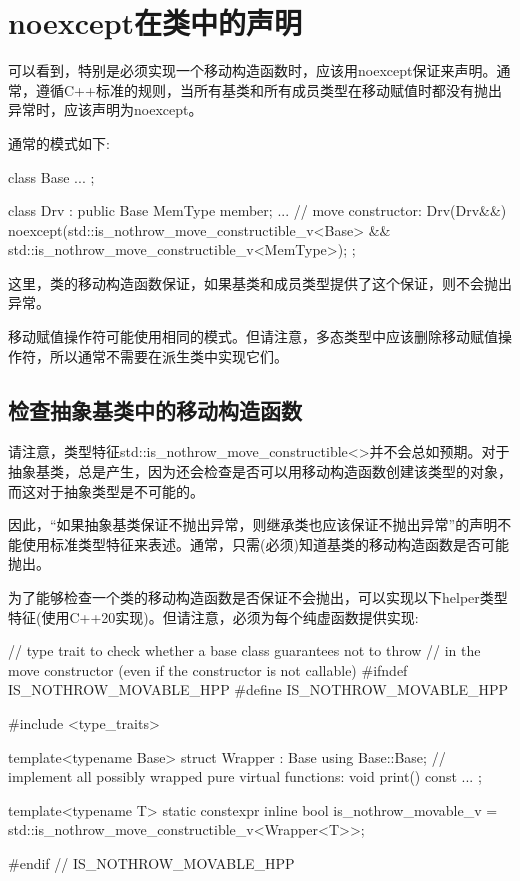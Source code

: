 \section{noexcept在类中的声明}
可以看到，特别是必须实现一个移动构造函数时，应该用noexcept保证来声明。通常，遵循C++标准的规则，当所有基类和所有成员类型在移动赋值时都没有抛出异常时，应该声明为noexcept。

通常的模式如下:

\begin{cppcode}
class Base {
	...
};

class Drv : public Base {
	MemType member;
	...
	// move constructor:
	Drv(Drv&&) noexcept(std::is_nothrow_move_constructible_v<Base> &&
	std::is_nothrow_move_constructible_v<MemType>);
};
\end{cppcode}

这里，类的移动构造函数保证，如果基类和成员类型提供了这个保证，则不会抛出异常。

移动赋值操作符可能使用相同的模式。但请注意，多态类型中应该删除移动赋值操作符，所以通常不需要在派生类中实现它们。

\subsection{检查抽象基类中的移动构造函数}

请注意，类型特征std::is_nothrow_move_constructible<>并不会总如预期。对于抽象基类，总是产生，因为还会检查是否可以用移动构造函数创建该类型的对象，而这对于抽象类型是不可能的。

因此，“如果抽象基类保证不抛出异常，则继承类也应该保证不抛出异常”的声明不能使用标准类型特征来表述。通常，只需(必须)知道基类的移动构造函数是否可能抛出。

为了能够检查一个类的移动构造函数是否保证不会抛出，可以实现以下helper类型特征(使用C++20实现)。但请注意，必须为每个纯虚函数提供实现:

\begin{cppcode}
// type trait to check whether a base class guarantees not to throw
// in the move constructor (even if the constructor is not callable)
#ifndef IS_NOTHROW_MOVABLE_HPP
#define IS_NOTHROW_MOVABLE_HPP

#include <type_traits>

template<typename Base>
struct Wrapper : Base {
	using Base::Base;
	// implement all possibly wrapped pure virtual functions:
	void print() const {}
	...
};

template<typename T>
static constexpr inline bool is_nothrow_movable_v
	= std::is_nothrow_move_constructible_v<Wrapper<T>>;

#endif // IS_NOTHROW_MOVABLE_HPP
\end{cppcode}

